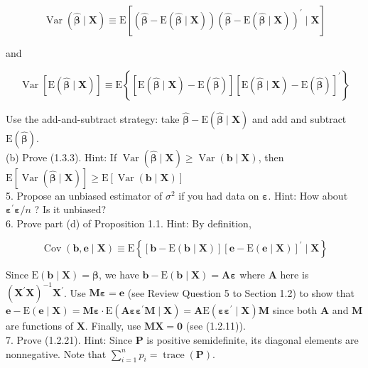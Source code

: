 \documentclass[10pt]{article}
\begin{document}
$$
\operatorname{Var}(\widehat{\boldsymbol{\beta}} \mid \mathbf{X}) \equiv \mathrm{E}\left[(\widehat{\boldsymbol{\beta}}-\mathrm{E}(\widehat{\boldsymbol{\beta}} \mid \mathbf{X}))(\widehat{\boldsymbol{\beta}}-\mathrm{E}(\widehat{\boldsymbol{\beta}} \mid \mathbf{X}))^{\prime} \mid \mathbf{X}\right]
$$

and

$$
\operatorname{Var}[\mathrm{E}(\widehat{\boldsymbol{\beta}} \mid \mathbf{X})] \equiv \mathrm{E}\left\{[\mathrm{E}(\widehat{\boldsymbol{\beta}} \mid \mathbf{X})-\mathrm{E}(\widehat{\boldsymbol{\beta}})][\mathrm{E}(\widehat{\boldsymbol{\beta}} \mid \mathbf{X})-\mathrm{E}(\widehat{\boldsymbol{\beta}})]^{\prime}\right\}
$$

Use the add-and-subtract strategy: take $\widehat{\boldsymbol{\beta}}-\mathrm{E}(\widehat{\boldsymbol{\beta}} \mid \mathbf{X})$ and add and subtract $\mathrm{E}(\widehat{\boldsymbol{\beta}})$.\\
(b) Prove (1.3.3). Hint: If $\operatorname{Var}(\widehat{\boldsymbol{\beta}} \mid \mathbf{X}) \geq \operatorname{Var}(\mathbf{b} \mid \mathbf{X})$, then $\mathrm{E}[\operatorname{Var}(\widehat{\boldsymbol{\beta}} \mid \mathbf{X})] \geq \mathrm{E}[\operatorname{Var}(\mathbf{b} \mid \mathbf{X})]$\\
5. Propose an unbiased estimator of $\sigma^{2}$ if you had data on $\boldsymbol{\varepsilon}$. Hint: How about $\boldsymbol{\varepsilon}^{\prime} \boldsymbol{\varepsilon} / n$ ? Is it unbiased?\\
6. Prove part (d) of Proposition 1.1. Hint: By definition,

$$
\operatorname{Cov}(\mathbf{b}, \mathbf{e} \mid \mathbf{X}) \equiv \mathrm{E}\left\{[\mathbf{b}-\mathrm{E}(\mathbf{b} \mid \mathbf{X})][\mathbf{e}-\mathrm{E}(\mathbf{e} \mid \mathbf{X})]^{\prime} \mid \mathbf{X}\right\}
$$

Since $\mathrm{E}(\mathbf{b} \mid \mathbf{X})=\boldsymbol{\beta}$, we have $\mathbf{b}-\mathrm{E}(\mathbf{b} \mid \mathbf{X})=\mathbf{A} \boldsymbol{\varepsilon}$ where $\mathbf{A}$ here is $\left(\mathbf{X}^{\prime} \mathbf{X}\right)^{-1} \mathbf{X}^{\prime}$. Use $\mathbf{M} \boldsymbol{\varepsilon}=\mathbf{e}$ (see Review Question 5 to Section 1.2) to show that $\mathbf{e}-\mathrm{E}(\mathbf{e} \mid \mathbf{X})=\mathbf{M} \boldsymbol{\varepsilon} \cdot \mathrm{E}\left(\mathbf{A} \boldsymbol{\varepsilon} \boldsymbol{\varepsilon}^{\prime} \mathbf{M} \mid \mathbf{X}\right)=\mathbf{A} \mathrm{E}\left(\boldsymbol{\varepsilon} \boldsymbol{\varepsilon}^{\prime} \mid \mathbf{X}\right) \mathbf{M}$ since both $\mathbf{A}$ and $\mathbf{M}$ are functions of $\mathbf{X}$. Finally, use $\mathbf{M X}=\mathbf{0}$ (see (1.2.11)).\\
7. Prove (1.2.21). Hint: Since $\mathbf{P}$ is positive semidefinite, its diagonal elements are nonnegative. Note that $\sum_{i=1}^{n} p_{i}=\operatorname{trace}(\mathbf{P})$.
\end{document}
